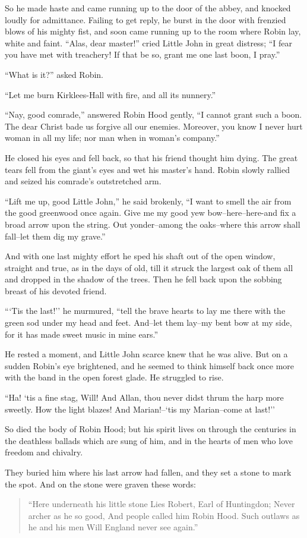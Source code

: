 So he made haste and came running up to the door of the abbey, and
knocked loudly for admittance. Failing to get reply, he burst in the
door with frenzied blows of his mighty fist, and soon came running up to
the room where Robin lay, white and faint. ``Alas, dear master!'' cried
Little John in great distress; ``I fear you have met with treachery! If
that be so, grant me one last boon, I pray.''

``What is it?'' asked Robin.

``Let me burn Kirklees-Hall with fire, and all its nunnery.''

``Nay, good comrade,'' answered Robin Hood gently, ``I cannot grant such
a boon. The dear Christ bade us forgive all our enemies. Moreover, you
know I never hurt woman in all my life; nor man when in woman's
company.''

He closed his eyes and fell back, so that his friend thought him dying.
The great tears fell from the giant's eyes and wet his master's hand.
Robin slowly rallied and seized his comrade's outstretched arm.

``Lift me up, good Little John,'' he said brokenly, ``I want to smell
the air from the good greenwood once again. Give me my good yew
bow--here--here-and fix a broad arrow upon the string. Out yonder--among
the oaks--where this arrow shall fall--let them dig my grave.''

And with one last mighty effort he sped his shaft out of the open
window, straight and true, as in the days of old, till it struck the
largest oak of them all and dropped in the shadow of the trees. Then he
fell back upon the sobbing breast of his devoted friend.

```Tis the last!'' he murmured, ``tell the brave hearts to lay me there
with the green sod under my head and feet. And--let them lay--my bent
bow at my side, for it has made sweet music in mine ears.''

He rested a moment, and Little John scarce knew that he was alive. But
on a sudden Robin's eye brightened, and he seemed to think himself back
once more with the band in the open forest glade. He struggled to rise.

``Ha! `tis a fine stag, Will! And Allan, thou never didst thrum the harp
more sweetly. How the light blazes! And Marian!--`tis my Marian--come at
last!''

So died the body of Robin Hood; but his spirit lives on through the
centuries in the deathless ballads which are sung of him, and in the
hearts of men who love freedom and chivalry.

They buried him where his last arrow had fallen, and they set a stone to
mark the spot. And on the stone were graven these words:

\begin{quote}
“Here underneath his little stone
Lies Robert, Earl of Huntingdon;
Never archer as he so good,
And people called him Robin Hood.
Such outlaws as he and his men
Will England never see again.”
\end{quote}
